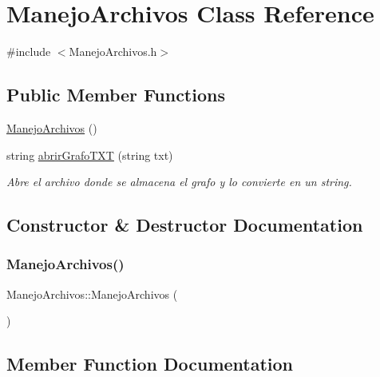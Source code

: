 \hypertarget{classManejoArchivos}{}\section{Manejo\+Archivos Class Reference}
\label{classManejoArchivos}


{\ttfamily \#include $<$Manejo\+Archivos.\+h$>$}

\subsection*{Public Member Functions}
\begin{DoxyCompactItemize}
\item 
\hyperlink{classManejoArchivos_ac90d54b411b660268dfee8bee05433c6}{Manejo\+Archivos} ()
\item 
string \hyperlink{classManejoArchivos_aacd0ea7c67902057b0b9d92c475c9837}{abrir\+Grafo\+T\+XT} (string txt)
\begin{DoxyCompactList}\small\item\em Abre el archivo donde se almacena el grafo y lo convierte en un string. \end{DoxyCompactList}\end{DoxyCompactItemize}


\subsection{Constructor \& Destructor Documentation}
\mbox{\label{classManejoArchivos_ac90d54b411b660268dfee8bee05433c6}} 
\subsubsection{\texorpdfstring{Manejo\+Archivos()}{ManejoArchivos()}}
{\footnotesize\ttfamily Manejo\+Archivos\+::\+Manejo\+Archivos (\begin{DoxyParamCaption}{ }\end{DoxyParamCaption})}



\subsection{Member Function Documentation}
\mbox{\label{classManejoArchivos_aacd0ea7c67902057b0b9d92c475c9837}} 
